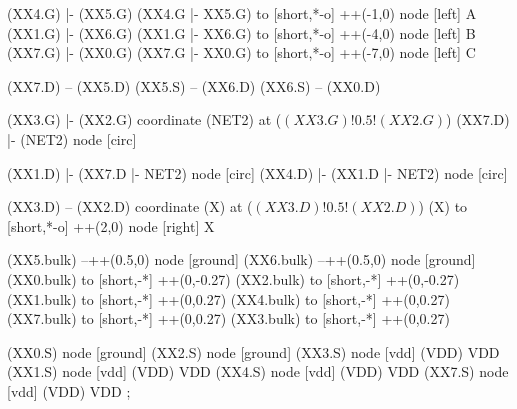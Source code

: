 \begin{circuitikz}[american]

	(XX4.G) |- (XX5.G)
	(XX4.G |- XX5.G) to [short,*-o] ++(-1,0) node [left] {A}
	(XX1.G) |- (XX6.G)
	(XX1.G |- XX6.G) to [short,*-o] ++(-4,0) node [left] {B}
	(XX7.G) |- (XX0.G)
	(XX7.G |- XX0.G) to [short,*-o] ++(-7,0) node [left] {C}
	
	(XX7.D) -- (XX5.D)
	(XX5.S) -- (XX6.D)
	(XX6.S) -- (XX0.D)
	
	(XX3.G) |- (XX2.G)
	coordinate (NET2) at ($(XX3.G)!0.5!(XX2.G)$) 
	(XX7.D) |- (NET2) node [circ]{}
	
	(XX1.D) |- (XX7.D |- NET2) node [circ]{}
	(XX4.D) |- (XX1.D |- NET2) node [circ]{}  
	
	(XX3.D) -- (XX2.D) 
	coordinate (X) at ($(XX3.D)!0.5!(XX2.D)$)
	(X) to [short,*-o] ++(2,0) node [right] {X}

	(XX5.bulk) --++(0.5,0) node [ground]{}	
	(XX6.bulk) --++(0.5,0) node [ground]{}
	(XX0.bulk) to [short,-*] ++(0,-0.27)
	(XX2.bulk) to [short,-*] ++(0,-0.27)
	(XX1.bulk) to [short,-*] ++(0,0.27)
	(XX4.bulk) to [short,-*] ++(0,0.27)
	(XX7.bulk) to [short,-*] ++(0,0.27)
	(XX3.bulk) to [short,-*] ++(0,0.27)
	

	(XX0.S) node [ground] {}
	(XX2.S) node [ground] {}
	(XX3.S) node [vdd] (VDD) {VDD}
	(XX1.S) node [vdd] (VDD) {VDD}
	(XX4.S) node [vdd] (VDD) {VDD}
	(XX7.S) node [vdd] (VDD) {VDD}
;

\end{circuitikz}
